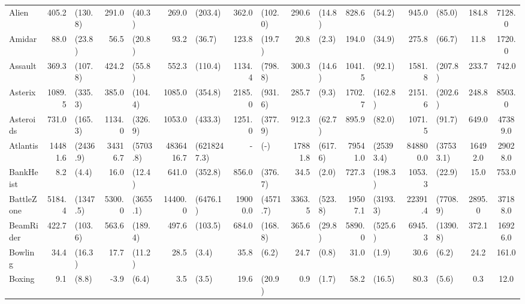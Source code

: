 \begin{landscape}
\begin{changemargin}{0cm}{0cm}
\begin{center}
\begin{table}[!htbp]
\begin{tabular}{l|rl|rl|rl|rl|rl|rl|rl|c|c}
\midrule
Alien          &    405.2 &    (130.8) &    291.0 &    (40.3) &      269.0 &      (203.4) &    362.0 &    (102.0) &    290.6 &   (14.8) &    828.6 &     (54.2) &     945.0 &     (85.0) &    184.8 &   7128.0 \\
Amidar         &     88.0 &     (23.8) &     56.5 &    (20.8) &       93.2 &       (36.7) &    123.8 &     (19.7) &     20.8 &    (2.3) &    194.0 &     (34.9) &     275.8 &     (66.7) &     11.8 &   1720.0 \\
Assault        &    369.3 &    (107.8) &    424.2 &    (55.8) &      552.3 &      (110.4) &   1134.4 &    (798.8) &    300.3 &   (14.6) &   1041.5 &     (92.1) &    1581.8 &    (207.8) &    233.7 &    742.0 \\
Asterix        &   1089.5 &    (335.3) &    385.0 &   (104.4) &     1085.0 &      (354.8) &   2185.0 &    (931.6) &    285.7 &    (9.3) &   1702.7 &    (162.8) &    2151.6 &    (202.6) &    248.8 &   8503.0 \\
Asteroids      &    731.0 &    (165.3) &   1134.0 &   (326.9) &     1053.0 &      (433.3) &   1251.0 &    (377.9) &    912.3 &   (62.7) &    895.9 &     (82.0) &    1071.5 &     (91.7) &    649.0 &  47389.0 \\
Atlantis       &  14481.6 &   (2436.9) &  34316.7 &  (5703.8) &  4836416.7 &  (6218247.3) &      - &      (-) &  17881.8 &  (617.6) &  79541.0 &  (25393.4) &  848800.0 &  (37533.1) &  16492.0 &  29028.0 \\
BankHeist      &      8.2 &      (4.4) &     16.0 &    (12.4) &      641.0 &      (352.8) &    856.0 &    (376.7) &     34.5 &    (2.0) &    727.3 &    (198.3) &    1053.3 &     (22.9) &     15.0 &    753.0 \\
BattleZone     &   5184.4 &   (1347.5) &   5300.0 &  (3655.1) &    14400.0 &     (6476.1) &  19000.0 &   (4571.7) &   3363.5 &  (523.8) &  19507.1 &   (3193.3) &   22391.4 &   (7708.9) &   2895.0 &  37188.0 \\
BeamRider      &    422.7 &    (103.6) &    563.6 &   (189.4) &      497.6 &      (103.5) &    684.0 &    (168.8) &    365.6 &   (29.8) &   5890.0 &    (525.6) &    6945.3 &   (1390.8) &    372.1 &  16926.0 \\
Bowling        &     34.4 &     (16.3) &     17.7 &    (11.2) &       28.5 &        (3.4) &     35.8 &      (6.2) &     24.7 &    (0.8) &     31.0 &      (1.9) &      30.6 &      (6.2) &     24.2 &    161.0 \\
Boxing         &      9.1 &      (8.8) &     -3.9 &     (6.4) &        3.5 &        (3.5) &     19.6 &     (20.9) &      0.9 &    (1.7) &     58.2 &     (16.5) &      80.3 &      (5.6) &      0.3 &     12.0 \\

\end{tabular}
\end{table}
\end{center}
\end{changemargin}
\end{landscape}
